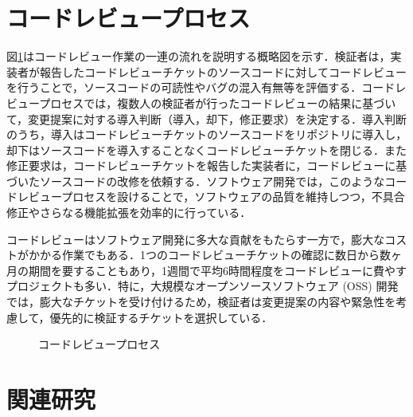 \documentclass[11pt]{jreport}
\begin{document}
\section{コードレビュープロセス}
図\ref{fig:codereviewprocess}はコードレビュー作業の一連の流れを説明する概略図を示す．検証者は，実装者が報告したコードレビューチケットのソースコードに対してコードレビューを行うことで，ソースコードの可読性やバグの混入有無等を評価する．コードレビュープロセスでは，複数人の検証者が行ったコードレビューの結果に基づいて，変更提案に対する導入判断（導入，却下，修正要求）を決定する．導入判断のうち，導入はコードレビューチケットのソースコードをリポジトリに導入し，却下はソースコードを導入することなくコードレビューチケットを閉じる．また修正要求は，コードレビューチケットを報告した実装者に，コードレビューに基づいたソースコードの改修を依頼する．ソフトウェア開発では，このようなコードレビュープロセスを設けることで，ソフトウェアの品質を維持しつつ，不具合修正やさらなる機能拡張を効率的に行っている．

コードレビューはソフトウェア開発に多大な貢献をもたらす一方で，膨大なコストがかかる作業でもある．1つのコードレビューチケットの確認に数日から数ヶ月の期間を要することもあり，1週間で平均6時間程度をコードレビューに費やすプロジェクトも多い\cite{review2}．特に，大規模なオープンソースソフトウェア (OSS) 開発では，膨大なチケットを受け付けるため，検証者は変更提案の内容や緊急性を考慮して，優先的に検証するチケットを選択している\cite{integrator}．

\begin{figure}[h]
\begin{center}
\caption{コードレビュープロセス}
\label{fig:codereviewprocess}
\end{center}
\end{figure}

\section{関連研究}
\end{document}
